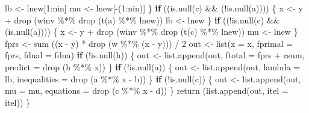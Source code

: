 \documentclass[
  12pt,
  letterpaper,
  DIV=11,
  numbers=noendperiod]{scrreprt}
\newenvironment{Shaded}{\begin{snugshade}}{\end{snugshade}}
\newcommand{\AttributeTok}[1]{\textcolor[rgb]{0.40,0.45,0.13}{#1}}
\newcommand{\ControlFlowTok}[1]{\textcolor[rgb]{0.00,0.23,0.31}{\textbf{#1}}}
\newcommand{\DecValTok}[1]{\textcolor[rgb]{0.68,0.00,0.00}{#1}}
\newcommand{\FunctionTok}[1]{\textcolor[rgb]{0.28,0.35,0.67}{#1}}
\newcommand{\NormalTok}[1]{\textcolor[rgb]{0.00,0.23,0.31}{#1}}
\newcommand{\OtherTok}[1]{\textcolor[rgb]{0.00,0.23,0.31}{#1}}
\newcommand{\SpecialCharTok}[1]{\textcolor[rgb]{0.37,0.37,0.37}{#1}}
\theoremstyle{remark}
\begin{document}
\begin{Shaded}
\begin{Highlighting}[]
\NormalTok{      lb }\OtherTok{\textless{}{-}}\NormalTok{ lnew[}\DecValTok{1}\SpecialCharTok{:}\NormalTok{nin]}
\NormalTok{      mu }\OtherTok{\textless{}{-}}\NormalTok{ lnew[}\SpecialCharTok{{-}}\NormalTok{(}\DecValTok{1}\SpecialCharTok{:}\NormalTok{nin)]}
\NormalTok{    \}}
    \ControlFlowTok{if}\NormalTok{ ((}\FunctionTok{is.null}\NormalTok{(c) }\SpecialCharTok{\&\&}\NormalTok{ (}\SpecialCharTok{!}\FunctionTok{is.null}\NormalTok{(a)))) \{}
\NormalTok{      x }\OtherTok{\textless{}{-}}\NormalTok{ y }\SpecialCharTok{+} \FunctionTok{drop}\NormalTok{ (winv }\SpecialCharTok{\%*\%} \FunctionTok{drop}\NormalTok{ (}\FunctionTok{t}\NormalTok{(a) }\SpecialCharTok{\%*\%}\NormalTok{ lnew))}
\NormalTok{      lb }\OtherTok{\textless{}{-}}\NormalTok{ lnew}
\NormalTok{    \}}
    \ControlFlowTok{if}\NormalTok{ ((}\SpecialCharTok{!}\FunctionTok{is.null}\NormalTok{(c) }\SpecialCharTok{\&\&}\NormalTok{ (}\FunctionTok{is.null}\NormalTok{(a)))) \{}
\NormalTok{      x }\OtherTok{\textless{}{-}}\NormalTok{ y }\SpecialCharTok{+} \FunctionTok{drop}\NormalTok{ (winv }\SpecialCharTok{\%*\%} \FunctionTok{drop}\NormalTok{ (}\FunctionTok{t}\NormalTok{(c) }\SpecialCharTok{\%*\%}\NormalTok{ lnew))}
\NormalTok{      mu }\OtherTok{\textless{}{-}}\NormalTok{ lnew}
\NormalTok{    \}}
\NormalTok{    fprs }\OtherTok{\textless{}{-}} \FunctionTok{sum}\NormalTok{ ((x }\SpecialCharTok{{-}}\NormalTok{ y) }\SpecialCharTok{*} \FunctionTok{drop}\NormalTok{ (w }\SpecialCharTok{\%*\%}\NormalTok{ (x }\SpecialCharTok{{-}}\NormalTok{ y))) }\SpecialCharTok{/} \DecValTok{2}
\NormalTok{    out }\OtherTok{\textless{}{-}} \FunctionTok{list}\NormalTok{(}\AttributeTok{x =}\NormalTok{ x,}
                \AttributeTok{fprimal =}\NormalTok{ fprs,}
                \AttributeTok{fdual =}\NormalTok{ fdua)}
    \ControlFlowTok{if}\NormalTok{ (}\SpecialCharTok{!}\FunctionTok{is.null}\NormalTok{(h)) \{}
\NormalTok{      out }\OtherTok{\textless{}{-}}
        \FunctionTok{list.append}\NormalTok{(out, }\AttributeTok{ftotal =}\NormalTok{ fprs }\SpecialCharTok{+}\NormalTok{ rsum, }\AttributeTok{predict =} \FunctionTok{drop}\NormalTok{ (h }\SpecialCharTok{\%*\%}\NormalTok{ x))}
\NormalTok{    \}}
    \ControlFlowTok{if}\NormalTok{ (}\SpecialCharTok{!}\FunctionTok{is.null}\NormalTok{(a)) \{}
\NormalTok{      out }\OtherTok{\textless{}{-}}
        \FunctionTok{list.append}\NormalTok{(out, }\AttributeTok{lambda =}\NormalTok{ lb, }\AttributeTok{inequalities =} \FunctionTok{drop}\NormalTok{ (a }\SpecialCharTok{\%*\%}\NormalTok{ x }\SpecialCharTok{{-}}\NormalTok{ b))}
\NormalTok{    \}}
    \ControlFlowTok{if}\NormalTok{ (}\SpecialCharTok{!}\FunctionTok{is.null}\NormalTok{(c)) \{}
\NormalTok{      out }\OtherTok{\textless{}{-}} \FunctionTok{list.append}\NormalTok{(out, }\AttributeTok{mu =}\NormalTok{ mu, }\AttributeTok{equations =} \FunctionTok{drop}\NormalTok{ (c }\SpecialCharTok{\%*\%}\NormalTok{ x }\SpecialCharTok{{-}}\NormalTok{ d))}
\NormalTok{    \}}
    \FunctionTok{return}\NormalTok{ (}\FunctionTok{list.append}\NormalTok{(out, }\AttributeTok{itel =}\NormalTok{ itel))}
\NormalTok{  \}}



\end{Highlighting}
\end{Shaded}
\end{document}
